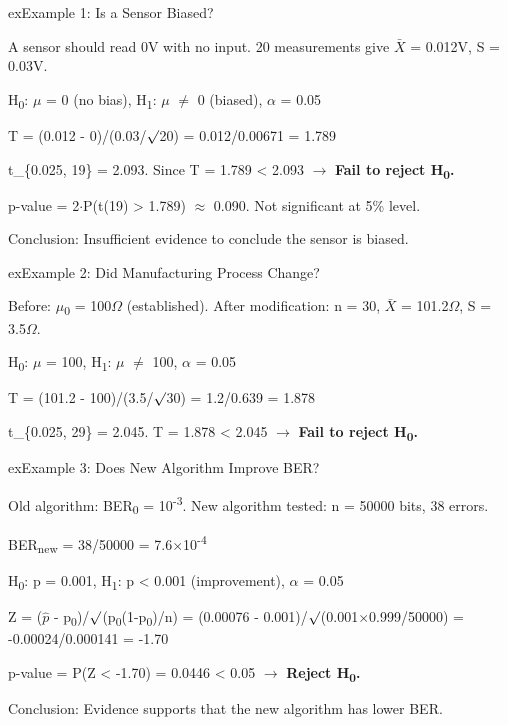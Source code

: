 
\begin{PSbox}[unbreakable]{ex}{Example 1: Is a Sensor Biased?}

A sensor should read 0V with no input. 20 measurements give \ensuremath{\bar{X}} = 0.012V, S = 0.03V.

H\textsubscript{0}: \ensuremath{\mu} = 0 (no bias), H\textsubscript{1}: \ensuremath{\mu} \ensuremath{\neq} 0 (biased), \ensuremath{\alpha} = 0.05

T = (0.012 - 0)/(0.03/\ensuremath{\surd}20) = 0.012/0.00671 = 1.789

t\_\{0.025, 19\} = 2.093. Since \textbar{}T\textbar{} = 1.789 \textless{} 2.093 \ensuremath{\to} \textbf{Fail to reject H\textsubscript{0}.}

p-value = 2\ensuremath{\cdot}P(t(19) \textgreater{} 1.789) \ensuremath{\approx} 0.090. Not significant at 5\% level.

Conclusion: Insufficient evidence to conclude the sensor is biased.

\end{PSbox}

\begin{PSbox}[unbreakable]{ex}{Example 2: Did Manufacturing Process Change?}

Before: \ensuremath{\mu}\textsubscript{0} = 100\ensuremath{\Omega} (established). After modification: n = 30, \ensuremath{\bar{X}} = 101.2\ensuremath{\Omega}, S = 3.5\ensuremath{\Omega}.

H\textsubscript{0}: \ensuremath{\mu} = 100, H\textsubscript{1}: \ensuremath{\mu} \ensuremath{\neq} 100, \ensuremath{\alpha} = 0.05

T = (101.2 - 100)/(3.5/\ensuremath{\surd}30) = 1.2/0.639 = 1.878

t\_\{0.025, 29\} = 2.045. \textbar{}T\textbar{} = 1.878 \textless{} 2.045 \ensuremath{\to} \textbf{Fail to reject H\textsubscript{0}.}

\end{PSbox}

\begin{PSbox}[unbreakable]{ex}{Example 3: Does New Algorithm Improve BER?}

Old algorithm: BER\textsubscript{0} = 10\textsuperscript{-3}. New algorithm tested: n = 50000 bits, 38 errors.

BER\textsubscript{new} = 38/50000 = 7.6\ensuremath{\times}10\textsuperscript{-4}

H\textsubscript{0}: p = 0.001, H\textsubscript{1}: p \textless{} 0.001 (improvement), \ensuremath{\alpha} = 0.05

Z = (\ensuremath{\hat{p}} - p\textsubscript{0})/\ensuremath{\surd}(p\textsubscript{0}(1-p\textsubscript{0})/n) = (0.00076 - 0.001)/\ensuremath{\surd}(0.001\ensuremath{\times}0.999/50000) = -0.00024/0.000141 = -1.70

p-value = P(Z \textless{} -1.70) = 0.0446 \textless{} 0.05 \ensuremath{\to} \textbf{Reject H\textsubscript{0}.}

Conclusion: Evidence supports that the new algorithm has lower BER.

\end{PSbox}


